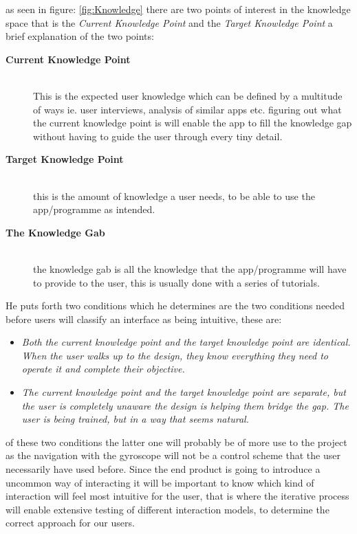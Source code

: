 as seen in figure: \ref{fig:Knowledge} there are two points of interest in the knowledge space that is the \textit{Current Knowledge Point} and the \textit{Target Knowledge Point} a brief explanation of the two points:
\begin{description}
 \item[\textbf{Current Knowledge Point}] \hfill\\
 This is the expected user knowledge which can be defined by a multitude of ways ie. user interviews, analysis of similar apps etc. figuring out what the current knowledge point is will enable the app to fill the knowledge gap without having to guide the user through every tiny detail. 
\item[\textbf{Target Knowledge Point}]\hfill\\
this is the amount of knowledge a user needs, to be able to use the app/programme as intended.
\item[\textbf{The Knowledge Gab}]\hfill\\
the knowledge gab is all the knowledge that the app/programme will have to provide to the user, this is usually done with a series of tutorials. 
\end{description}

He puts forth two conditions which he determines are the two conditions needed before users will classify an interface as being intuitive, these are:
\begin{itemize}
\item \textit{Both the current knowledge point and the target knowledge point are identical. When the user walks up to the design, they know everything they need to operate it and complete their objective.}
\item \textit{The current knowledge point and the target knowledge point are separate, but the user is completely unaware the design is helping them bridge the gap. The user is being trained, but in a way that seems natural.}
\end{itemize} 
of these two conditions the latter one will probably be of more use to the project as the navigation with the gyroscope will not be a control scheme that the user necessarily  have used before. Since the end product is going to introduce a uncommon way of interacting it will be important to know which kind of interaction will feel most intuitive for the user, that is where the iterative process will enable extensive testing of different interaction models, to determine the correct approach for our users.

